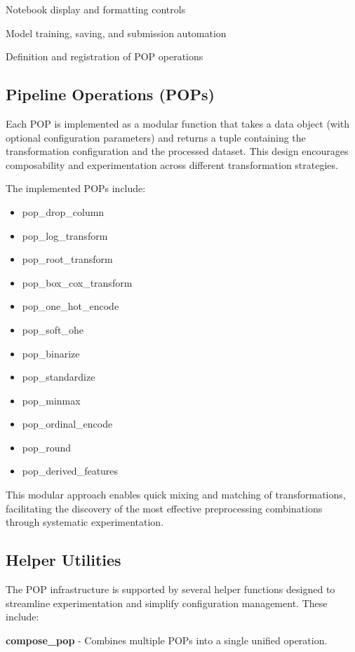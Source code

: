 Notebook display and formatting controls

Model training, saving, and submission automation

Definition and registration of POP operations

\subsection{Pipeline Operations (POPs)}\label{subsec:pipeline-operations-(pops)}
Each POP is implemented as a modular function that takes a data object (with optional configuration parameters) and returns a tuple containing the transformation configuration and the processed dataset.
This design encourages composability and experimentation across different transformation strategies.

The implemented POPs include:

\begin{itemize}
    \item pop\_drop\_column
    \item pop\_log\_transform
    \item pop\_root\_transform
    \item pop\_box\_cox\_transform
    \item pop\_one\_hot\_encode
    \item pop\_soft\_ohe
    \item pop\_binarize
    \item pop\_standardize
    \item pop\_minmax
    \item pop\_ordinal\_encode
    \item pop\_round
    \item pop\_derived\_features
\end{itemize}

This modular approach enables quick mixing and matching of transformations, facilitating the discovery of the most effective preprocessing combinations through systematic experimentation.

\subsection{Helper Utilities}\label{subsec:helper-utilities}
The POP infrastructure is supported by several helper functions designed to streamline experimentation and simplify configuration management.
These include:

\textbf{compose\_pop} - Combines multiple POPs into a single unified operation.

